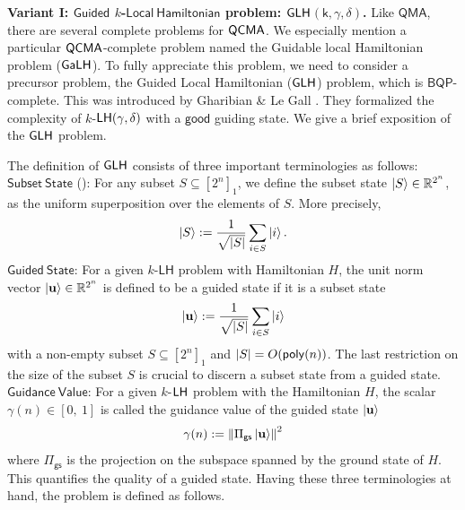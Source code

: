 \documentclass[11pt]{article}
\begin{document}
\textbf{Variant I: $\mathsf{Guided}$ $k$-$\mathsf{Local\ Hamiltonian}$ problem: $\mathsf{GLH}$$\mathsf{(k,\gamma,\delta)}$.} Like $\mathsf{QMA}$, there are several complete problems for $\mathsf{QCMA}$. We especially mention a particular $\mathsf{QCMA}$-complete problem named the Guidable local Hamiltonian problem ($\mathsf{GaLH}$). To fully appreciate this problem, we need to consider a precursor problem, the Guided Local Hamiltonian ($\mathsf{GLH}$) problem, which is $\mathsf{BQP}$-complete. This was introduced by Gharibian \& Le Gall \cite{gharibian2022dequantizing}. They formalized the complexity of $k$-$\mathsf{LH}(\gamma,\delta)$ with a $\mathsf{good}$ guiding state. We give a brief exposition of the $\mathsf{GLH}$ problem.\par
The definition of $\mathsf{GLH}$ consists of three important terminologies as follows:\newline
$\mathsf{Subset\ State}$ (\cite{grilo2015qma}): For any subset $S\subseteq [2^n]_1$, we define the subset state $\ket{S}\in \mathbb{R}^{2^n}$, as the uniform superposition over the elements of $S$. More precisely,
\begin{equation}
    \ket{S}:= \frac{1}{\sqrt{|S|}}\sum_{i\in S}\ket{i}.
\end{equation}
$\mathsf{Guided\ State}$: For a given $k$-$\mathsf{LH}$ problem with Hamiltonian $H$, the unit norm vector $\ket{\mathbf{u}}\in \mathbb{R}^{2^n}$ is defined to be a guided state if it is a subset state 
$$\ket{\mathbf{u}}:= \frac{1}{\sqrt{|S|}}\sum_{i\in S}\ket{i}$$ with a non-empty subset $S\subseteq [2^n]_1$ and $|S|=O(\mathsf{poly}(n))$. The last restriction on the size of the subset $S$ is crucial to discern a subset state from a guided state. \newline
$\mathsf{Guidance\ Value}$: For a given $k$-$\mathsf{LH}$ problem with the Hamiltonian $H$, the scalar $\gamma(n)\in [0,\ 1]$ is called the guidance value of the guided state $\ket{\mathbf{u}}$ $$\gamma(n):=\norm{\Pi_{\mathsf{gs}}\ket{\mathbf{u}}}^2$$ where $\Pi_{\mathsf{gs}}$ is the projection on the subspace spanned by the ground state of $H$. This quantifies the quality of a guided state. Having these three terminologies at hand, the problem is defined as follows.
\end{document}
